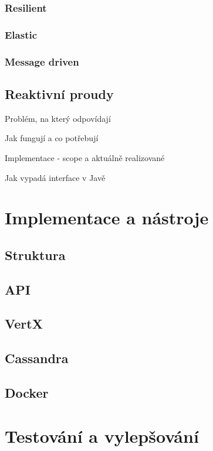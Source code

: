 \documentclass[FM,DP]{tulthesis}
\begin{document}
\subsection{Resilient}

\subsection{Elastic}

\subsection{Message driven}

\section{Reaktivní proudy}
Problém, na který odpovídají

Jak fungují a co potřebují

Implementace - scope a aktuálně realizované

Jak vypadá interface v Javě

\chapter{Implementace a nástroje}

\section{Struktura}

\section{API}

\section{VertX}

\section{Cassandra}

\section{Docker}

\chapter{Testování a vylepšování}
\end{document}
